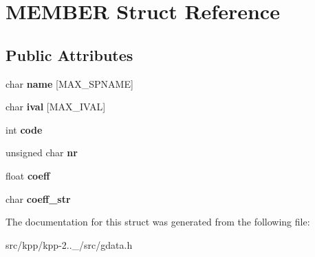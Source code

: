 \hypertarget{structMEMBER}{}\section{M\+E\+M\+B\+ER Struct Reference}
\label{structMEMBER}
\subsection*{Public Attributes}
\begin{DoxyCompactItemize}
\item 
\mbox{\label{structMEMBER_aac02b1079829b6d2dbc48fda72af49b9}} 
char {\bfseries name} \mbox{[}M\+A\+X\+\_\+\+S\+P\+N\+A\+ME\mbox{]}
\item 
\mbox{\label{structMEMBER_a7de686db282779e3dbaf0d37ac787275}} 
char {\bfseries ival} \mbox{[}M\+A\+X\+\_\+\+I\+V\+AL\mbox{]}
\item 
\mbox{\label{structMEMBER_a828d30013414b53de3ee8f895079e79b}} 
int {\bfseries code}
\item 
\mbox{\label{structMEMBER_afe2e8f5113523a2dca6cc3c06140de40}} 
unsigned char {\bfseries nr}
\item 
\mbox{\label{structMEMBER_ac04cd9e57f5f5140569d8db235dd10c0}} 
float {\bfseries coeff}
\item 
\mbox{\label{structMEMBER_ae54f495ca287a597cec320b5b43449d2}} 
char {\bfseries coeff\+\_\+str}
\end{DoxyCompactItemize}


The documentation for this struct was generated from the following file\+:\begin{DoxyCompactItemize}
\item 
src/kpp/kpp-\/2..\+\_/src/gdata.\+h\end{DoxyCompactItemize}
